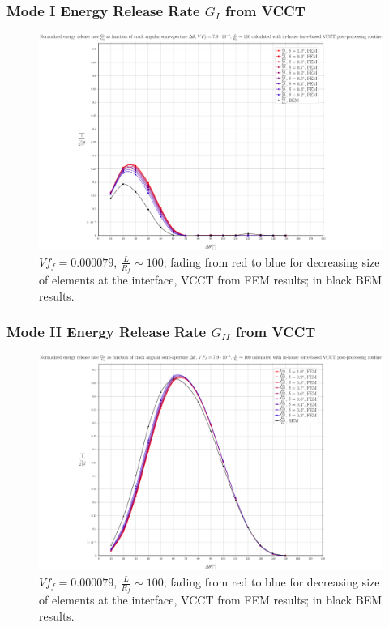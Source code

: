 \documentclass[first,firstsupp,lastsupp,last,hyperref,table]{ETHclass}
\begin{document}
\begin{frame}
\frametitle{\small Mode I Energy Release Rate $G_{I}$ from VCCT}
\vspace{-0.5cm}
\centering
\captionsetup[figure]{font=scriptsize,labelfont=scriptsize}
\begin{figure}[!h]
\centering
\includegraphics[height=0.7\textheight]{2017-07-10_AbqRunSummary_SmallStrain_M-F-VCCT_GI.pdf}
  \caption{\scriptsize $Vf_{f}=0.000079$, $\frac{L}{R_{f}}\sim 100$; fading from red to blue for decreasing size of elements at the interface, VCCT from FEM results; in black BEM results.}
  \label{fig:res1}
\end{figure}
\end{frame}

\begin{frame}
\frametitle{\small Mode II Energy Release Rate $G_{II}$ from VCCT}
\vspace{-0.5cm}
\centering
\captionsetup[figure]{font=scriptsize,labelfont=scriptsize}
\begin{figure}[!h]
\centering
\includegraphics[height=0.7\textheight]{2017-07-10_AbqRunSummary_SmallStrain_M-F-VCCT_GII.pdf}
  \caption{\scriptsize $Vf_{f}=0.000079$, $\frac{L}{R_{f}}\sim 100$; fading from red to blue for decreasing size of elements at the interface, VCCT from FEM results; in black BEM results.}
  \label{fig:res1}
\end{figure}
\end{frame}
\end{document}
